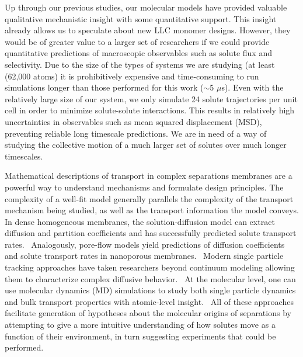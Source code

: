 \documentclass[aps,pre,preprint,groupedaddress]{revtex4-2}
\begin{document}
  Up through our previous studies, our molecular models have provided valuable 
  qualitative mechanistic insight with some quantitative support. This insight
  already allows us to speculate about new LLC monomer designs. However, they 
  would be of greater value to a larger set of researchers if we could provide 
  quantitative predictions of macroscopic observables such as solute flux and 
  selectivity. Due to the size of the types of systems we are studying (at least
  (62,000 atoms) it is prohibitively expensive and time-consuming to
  run simulations longer than those performed for this work ($\sim$5 $\mu$s). 
  Even with the relatively large size of our system, we only simulate 24 solute trajectories per unit cell in order
  to minimize solute-solute interactions. This results in relatively high uncertainties
  in observables such as mean squared displacement (MSD), preventing reliable long
  timescale predictions. We are in need of a way of studying the collective motion
  of a much larger set of solutes over much longer timescales.
  
  Mathematical descriptions of transport in complex separations membranes are 
  a powerful way to understand mechanisms and formulate design principles. 
  \cite{vinh-thang_predictive_2013,geens_transport_2006,darvishmanesh_mass_2016}
  The complexity of a well-fit model generally parallels the complexity of the transport 
  mechanism being studied, as well as the transport information the model conveys.
  In dense homogeneous membranes, the solution-diffusion model can extract 
  diffusion and partition coefficients and has successfully predicted solute 
  transport rates.~\cite{wijmans_solution-diffusion_1995} Analogously, pore-flow
  models yield predictions of diffusion coefficients and solute transport rates 
  in nanoporous membranes.~\cite{paul_diffusive_1974} Modern single particle 
  tracking approaches have taken researchers beyond continuum modeling allowing them to 
  characterize complex diffusive behavior.~\cite{manzo_review_2015} At the molecular
  level, one can use molecular dynamics (MD) simulations to study both single 
  particle dynamics and bulk transport properties with atomic-level insight.~\cite{coscia_chemically_2019,maginn_best_2018}
  All of these approaches facilitate generation of hypotheses about the
  molecular origins of separations by attempting to give a more intuitive 
  understanding of how solutes move as a function of their environment, in turn
  suggesting experiments that could be performed.
\end{document}
